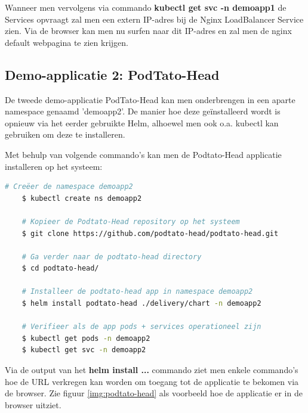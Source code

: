 Wanneer men vervolgens via commando {\bf kubectl get svc -n demoapp1} de Services opvraagt zal men een extern IP-adres bij de Nginx LoadBalancer Service zien. Via de browser kan men nu surfen naar dit IP-adres en zal men de nginx default webpagina te zien krijgen. 

\subsection{Demo-applicatie 2: PodTato-Head}
\label{subsec:podtato-setup}

De tweede demo-applicatie PodTato-Head kan men onderbrengen in een aparte namespace genaamd 'demoapp2'. De manier hoe deze geïnstalleerd wordt is opnieuw via het eerder gebruikte Helm, alhoewel men ook o.a. kubectl kan gebruiken om deze te installeren. \autocite{Gavant2022}

Met behulp van volgende commando's kan men de Podtato-Head applicatie installeren op het systeem:
\begin{lstlisting}[language=bash]
    # Creëer de namespace demoapp2
    $ kubectl create ns demoapp2
    
    # Kopieer de Podtato-Head repository op het systeem
    $ git clone https://github.com/podtato-head/podtato-head.git
    
    # Ga verder naar de podtato-head directory
    $ cd podtato-head/
    
    # Installeer de podtato-head app in namespace demoapp2
    $ helm install podtato-head ./delivery/chart -n demoapp2 
    
    # Verifieer als de app pods + services operationeel zijn
    $ kubectl get pods -n demoapp2
    $ kubectl get svc -n demoapp2
\end{lstlisting} 

Via de output van het {\bf helm install ...} commando ziet men enkele commando's hoe de URL verkregen kan worden om toegang tot de applicatie te bekomen via de browser.  \newline Zie figuur \ref{img:podtato-head} als voorbeeld hoe de applicatie er in de browser uitziet. 

